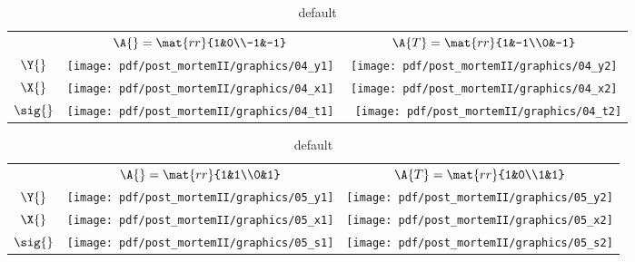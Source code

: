 \begin{table}[htdp]
\begin{center}
\begin{tabular}{ccc}
 & $\A{}  = \mat{rr}{1&0\\-1&-1}$ 
 & $\A{T} = \mat{rr}{1&-1\\0&-1}$ \\[35pt]
 $\Y{}$   & \qquad \texttt{[image: pdf/post\_mortemII/graphics/04\_y1]} 
          & \qquad \texttt{[image: pdf/post\_mortemII/graphics/04\_y2]} \\[15pt]
 $\X{}$   & \qquad \texttt{[image: pdf/post\_mortemII/graphics/04\_x1]}
          & \qquad \texttt{[image: pdf/post\_mortemII/graphics/04\_x2]} \\[20pt]
 $\sig{}$ & \quad  \texttt{[image: pdf/post\_mortemII/graphics/04\_t1]}
          & \,\    \texttt{[image: pdf/post\_mortemII/graphics/04\_t2]} \\[20pt]
\end{tabular}
\end{center}
\label{tab:pmII:visualsd}
\caption{default}
\end{table}%
\clearpage

\begin{table}[htdp]
\begin{center}
\begin{tabular}{ccc}
 & $\A{}  = \mat{rr}{1&1\\0&1}$ 
 & $\A{T} = \mat{rr}{1&0\\1&1}$ \\[35pt]
 $\Y{}$   & \qquad \texttt{[image: pdf/post\_mortemII/graphics/05\_y1]} 
          & \qquad \texttt{[image: pdf/post\_mortemII/graphics/05\_y2]} \\[15pt]
 $\X{}$   & \qquad \texttt{[image: pdf/post\_mortemII/graphics/05\_x1]}
          & \qquad \texttt{[image: pdf/post\_mortemII/graphics/05\_x2]} \\[20pt]
 $\sig{}$ &        \texttt{[image: pdf/post\_mortemII/graphics/05\_s1]}
          &        \texttt{[image: pdf/post\_mortemII/graphics/05\_s2]} \\[20pt]
\end{tabular}
\end{center}
\label{tab:pmII:visualse}
\caption{default}
\end{table}%
\clearpage

